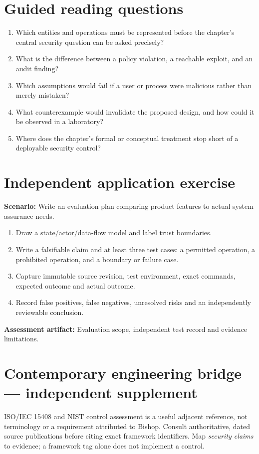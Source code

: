 \documentclass[10pt,letterpaper]{article}
\begin{document}
\section{Guided reading questions}
\begin{enumerate}
\item Which entities and operations must be represented before the chapter's central security question can be asked precisely?
\item What is the difference between a policy violation, a reachable exploit, and an audit finding?
\item Which assumptions would fail if a user or process were malicious rather than merely mistaken?
\item What counterexample would invalidate the proposed design, and how could it be observed in a laboratory?
\item Where does the chapter's formal or conceptual treatment stop short of a deployable security control?
\end{enumerate}
\section{Independent application exercise}
\textbf{Scenario:} Write an evaluation plan comparing product features to actual system assurance needs.
\begin{enumerate}
\item Draw a state/actor/data-flow model and label trust boundaries.
\item Write a falsifiable claim and at least three test cases: a permitted operation, a prohibited operation, and a boundary or failure case.
\item Capture immutable source revision, test environment, exact commands, expected outcome and actual outcome.
\item Record false positives, false negatives, unresolved risks and an independently reviewable conclusion.
\end{enumerate}
\textbf{Assessment artifact:} Evaluation scope, independent test record and evidence limitations.
\section{Contemporary engineering bridge --- independent supplement}
ISO/IEC 15408 and NIST control assessment is a useful adjacent reference, not terminology or a requirement attributed to Bishop. Consult authoritative, dated source publications before citing exact framework identifiers. Map \emph{security claims} to evidence; a framework tag alone does not implement a control.
\end{document}
